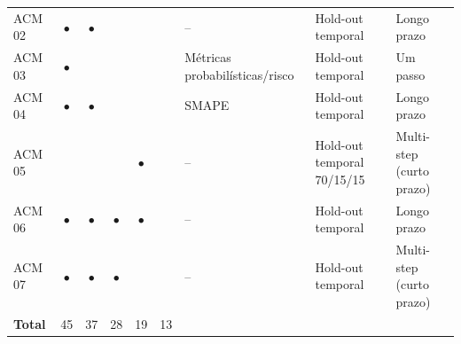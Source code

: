 {\begin{longtable}{p{1.3cm}ccccc p{2.0cm}p{3.2cm}p{2.0cm}}
ACM 02 & $\bullet$ & $\bullet$ &  &  &  & -- & Hold-out temporal & Longo prazo \\
ACM 03 & $\bullet$ &  &  &  &  & Métricas probabilísticas/risco & Hold-out temporal & Um passo \\
ACM 04 & $\bullet$ & $\bullet$ &  &  &  & SMAPE & Hold-out temporal & Longo prazo \\
ACM 05 &  &  &  & $\bullet$ &  & -- & Hold-out temporal 70/15/15 & Multi-step (curto prazo) \\
ACM 06 & $\bullet$ & $\bullet$ & $\bullet$ & $\bullet$ &  & -- & Hold-out temporal & Longo prazo \\
ACM 07 & $\bullet$ & $\bullet$ & $\bullet$ &  &  & -- & Hold-out temporal & Multi-step (curto prazo) \\
\midrule
\textbf{Total} & 45 & 37 & 28 & 19 & 13 & & & \\
\end{longtable}
}
